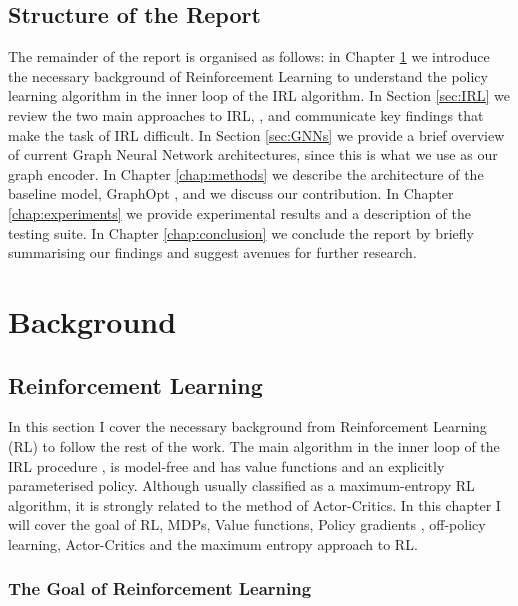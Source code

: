 \documentclass{report}
\numberwithin{equation}{section}
\numberwithin{figure}{section}
\numberwithin{table}{section}
\numberwithin{algorithm}{section}
\begin{document}
\section*{Structure of the Report}\label{sec:structureOfReport}
The remainder of the report is organised as follows:
in Chapter \ref{chap:Background} we introduce 
the necessary background 
of Reinforcement Learning to understand the policy learning 
algorithm in the inner loop of the IRL algorithm. In Section 
\ref{sec:IRL} we review the two main approaches to IRL, 
\citep{NgIRL,Ziebart2008}, and communicate key findings that 
make the task of IRL difficult. In Section \ref{sec:GNNs} 
we provide a brief overview of current Graph Neural Network 
architectures, since this is what we use as our graph encoder.
In Chapter \ref{chap:methods} we describe the architecture 
of the baseline model, GraphOpt \citep{GraphOpt}, and we 
discuss our contribution. In Chapter \ref{chap:experiments} we 
provide experimental results and a description of the testing 
suite. In Chapter \ref{chap:conclusion} we conclude the 
report by briefly summarising our findings and suggest avenues 
for further research.


\chapter{Background}\label{chap:Background}
\section{Reinforcement Learning}
\label{sec:RL}
In this section I cover the necessary background from Reinforcement 
Learning (RL) to follow the 
rest of the work. The main algorithm in the inner 
loop of the IRL procedure \citep{SAC2}, is model-free and has value 
functions and an explicitly parameterised policy. Although usually 
classified as a maximum-entropy RL algorithm, it is strongly related 
to the method of Actor-Critics. In this chapter I will cover 
the goal of RL, 
MDPs, Value functions, Policy gradients \citep{REINFORCE}, 
off-policy learning, Actor-Critics \citep{Tsitsiklis} and 
the maximum entropy approach to RL.

\subsection{The Goal of Reinforcement Learning}
\label{sec:RLGoal}
\end{document}
